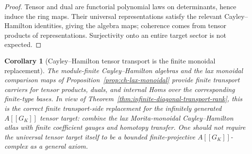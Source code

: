 \documentclass[11pt]{article}
\newtheorem{corollary}[theorem]{Corollary}
\theoremstyle{definition}
\begin{document}
\begin{proof}
Tensor and dual are functorial polynomial laws on determinants, hence induce the ring maps.  Their universal representations satisfy the relevant Cayley--Hamilton identities, giving the algebra maps; coherence comes from tensor products of representations.  Surjectivity onto an entire target sector is not expected.
\end{proof}

\begin{corollary}[Cayley--Hamilton tensor transport is the finite monoidal replacement]\label{cor:ch-finite-monoidal-replacement}
The module-finite Cayley--Hamilton algebras and the lax monoidal comparison maps of Proposition~\ref{prop:ch-lax-monoidal} provide finite transport carriers for tensor products, duals, and internal Homs over the corresponding finite-type bases.  In view of Theorem~\ref{thm:infinite-diagonal-transport-rank}, this is the correct finite transport-side replacement for the infinitely generated $A[[G_K]]$ tensor target: combine the lax Morita-monoidal Cayley--Hamilton atlas with finite coefficient gauges and homotopy transfer.  One should not require the universal tensor target itself to be a bounded finite-projective $A[[G_K]]$-complex as a general axiom.
\end{corollary}
\end{document}
